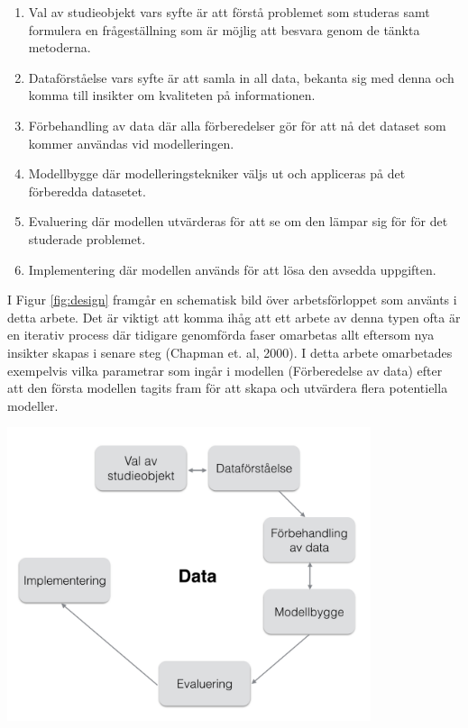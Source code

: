 \begin{enumerate}
  \item Val av studieobjekt vars syfte är att förstå problemet som studeras samt formulera en frågeställning som är möjlig att besvara genom de tänkta metoderna.
  \item Dataförståelse vars syfte är att samla in all data, bekanta sig med denna och komma till insikter om kvaliteten på informationen.
  \item Förbehandling av data där alla förberedelser gör för att nå det dataset som kommer användas vid modelleringen.
  \item Modellbygge där modelleringstekniker väljs ut och appliceras på det förberedda datasetet.
  \item Evaluering där modellen utvärderas för att se om den lämpar sig för för det studerade problemet.
  \item Implementering där modellen används för att lösa den avsedda uppgiften.
\end{enumerate}

I Figur \ref{fig:design} framgår en schematisk bild över arbetsförloppet som använts i detta arbete. Det är viktigt att komma ihåg att ett arbete av denna typen ofta är en iterativ process där tidigare genomförda faser omarbetas allt eftersom nya insikter skapas i senare steg (Chapman et. al, 2000). I detta arbete omarbetades exempelvis vilka parametrar som ingår i modellen (Förberedelse av data) efter att den första modellen tagits fram för att skapa och utvärdera flera potentiella modeller.

\noindent\begin{minipage}{\textwidth}
\centering
\includegraphics[width=0.8\textwidth]{Data.png}
\label{fig:design}            
\end{minipage}
\\

